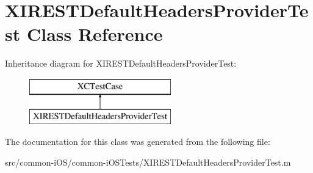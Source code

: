\hypertarget{interface_x_i_r_e_s_t_default_headers_provider_test}{}\section{X\+I\+R\+E\+S\+T\+Default\+Headers\+Provider\+Test Class Reference}
\label{interface_x_i_r_e_s_t_default_headers_provider_test}
Inheritance diagram for X\+I\+R\+E\+S\+T\+Default\+Headers\+Provider\+Test\+:\begin{figure}[H]
\begin{center}
\leavevmode
\includegraphics[height=2.000000cm]{interface_x_i_r_e_s_t_default_headers_provider_test}
\end{center}
\end{figure}


The documentation for this class was generated from the following file\+:\begin{DoxyCompactItemize}
\item 
src/common-\/i\+O\+S/common-\/i\+O\+S\+Tests/X\+I\+R\+E\+S\+T\+Default\+Headers\+Provider\+Test.\+m\end{DoxyCompactItemize}
